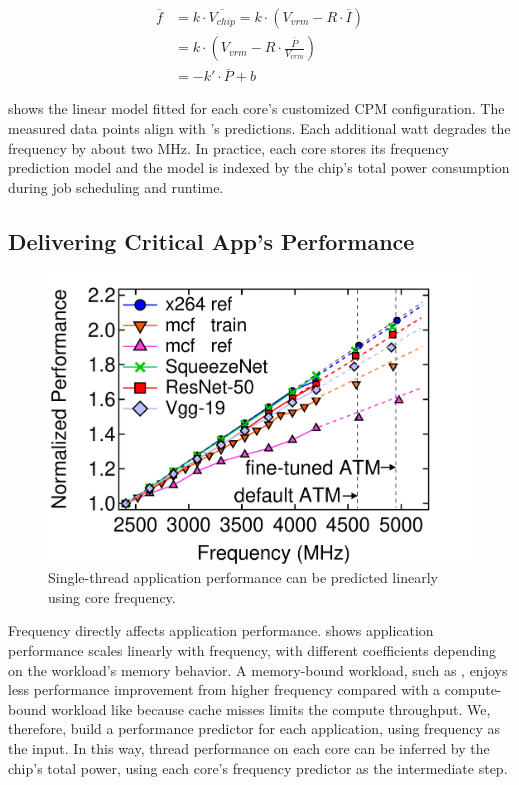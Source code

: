 \begin{equation}\label{eq:freq-pred}
\begin{split}
\overline{f} &= k \cdot \overline{V_{chip}} = k \cdot (V_{vrm} - R \cdot \overline{I})\\
&= k \cdot (V_{vrm} - R \cdot \frac{\overline{P}}{V_{vrm}})\\
&= -k' \cdot \overline{P} + b
\end{split}
\end{equation}

 shows the linear model fitted for each core's customized CPM configuration. The measured data points align with 's predictions. Each additional watt degrades the frequency by about two MHz. In practice, each core stores its frequency prediction model and the model is indexed by the chip's total power consumption during job scheduling and runtime.

\subsection{Delivering Critical App's Performance}
\label{sec:process:schedule:framework}

\begin{figure}
  \centering
      \includegraphics[trim=0 0 0 0,clip,width=.6\linewidth]{graphs/process/perf-pred.pdf}
      \captionsetup{width=.9\linewidth}
      \caption{Single-thread application performance can be predicted linearly using core frequency.}
\label{fig:1t-perf-pred}
\end{figure}

Frequency directly affects application performance.  shows application performance scales linearly with frequency, with different coefficients depending on the workload's memory behavior. A memory-bound workload, such as , enjoys less performance improvement from higher frequency compared with a compute-bound workload like  because cache misses limits the compute throughput. We, therefore, build a performance predictor for each application, using frequency as the input. In this way, thread performance on each core can be inferred by the chip's total power, using each core's frequency predictor as the intermediate step.

